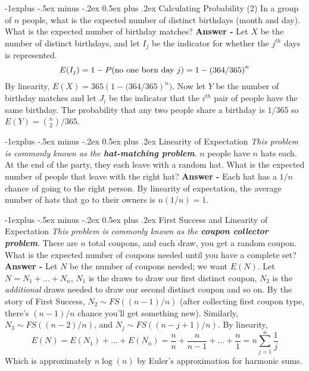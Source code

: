 \documentclass[10pt,landscape]{article}
\makeatletter
\renewcommand{\subsection}{\@startsection{subsection}{2}{0mm}%
                                {-1explus -.5ex minus -.2ex}%
                                {0.5ex plus .2ex}%
                                {\normalfont\normalsize\bfseries}}
\makeatother
\begin{document}
\begin{multicols}{3}
\subsection{Calculating Probability (2)} In a group of $n$ people, what is the expected number of distinct birthdays (month and day). What is the expected number of birthday matches? \textbf{Answer -} Let $X$ be the number of distinct birthdays, and let $I_j$ be the indicator for whether the $j^{th}$ days is represented. \[E(I_j) = 1-P(\textnormal{no one born day }j) = 1 - \left(364/365\right)^n\] By linearity, $\boxed{E(X) = 365\left(1-(364/365\right)^n)}$. 
Now let $Y$ be the number of birthday matches and let $J_i$ be the indicator that the $i^{th}$ pair of people have the same birthday. The probability that any two people share a birthday is $1/365$ so $\boxed{E(Y) = \binom{n}{2} / 365}$. 

\subsection{Linearity of Expectation}
\emph{This problem is commonly known as the \textbf{hat-matching problem}}.
$n$ people have $n$ hats each. At the end of the party, they each leave with a random hat. What is the expected number of people that leave with the right hat? \textbf{Answer - } Each hat has a $1/n$ chance of going to the right person. By linearity of expectation, the average number of hats that go to their owners is $\boxed{n(1/n) = 1}$.

\subsection{First Success and Linearity of Expectation}
\emph{This problem is commonly known as the \textbf{coupon collector problem}}.
There are $n$ total coupons, and each draw, you get a random coupon. What is the expected number of coupons needed until you have a complete set? \textbf{Answer - } Let $N$ be the number of coupons needed; we want $E(N)$. Let $N = N_1 + \dots + N_n$, $N_1$ is the draws to draw our first distinct coupon, $N_2$ is the \emph{additional} draws needed to draw our second distinct coupon and so on. By the story of First Success, $N_2 \sim FS((n-1)/n)$ (after collecting first coupon type, there's $(n-1)/n$ chance you'll get something new). Similarly, $N_3 \sim FS((n-2)/n)$, and $N_j \sim FS((n-j+1)/n)$. By linearity,
\[E(N) = E(N_1) + \dots + E(N_n) = \frac{n}{n} + \frac{n}{n-1} + \dots + \frac{n}{1} = \boxed{n\sum^n_{j=1} \frac{1}{j}}\]
Which is approximately $n \log(n)$ by Euler's approximation for harmonic sums.


\end{multicols}
\end{document}
